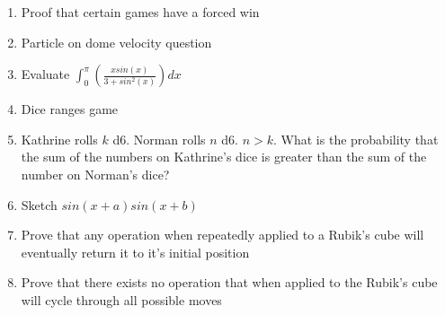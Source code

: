 \documentclass[a4paper]{article}
\begin{document}
\begin{enumerate}
\item
Proof that certain games have a forced win

\item
Particle on dome velocity question

\item
Evaluate
$\int_{0}^{\pi}(\frac{xsin(x)}{3 + sin^2(x)})dx$

\item
Dice ranges game

\item
Kathrine rolls $k$ d6. Norman rolls $n$ d6. $n > k$. What is the probability that the sum of the numbers on Kathrine's dice is greater than the sum of the number on Norman's dice?

\item
Sketch $sin(x+a)sin(x+b)$

\item
Prove that any operation when repeatedly applied to a Rubik's cube will eventually return it to it's initial position

\item
Prove that there exists no operation that when applied to the Rubik's cube will cycle through all possible moves

\end{enumerate}
\end{document}

